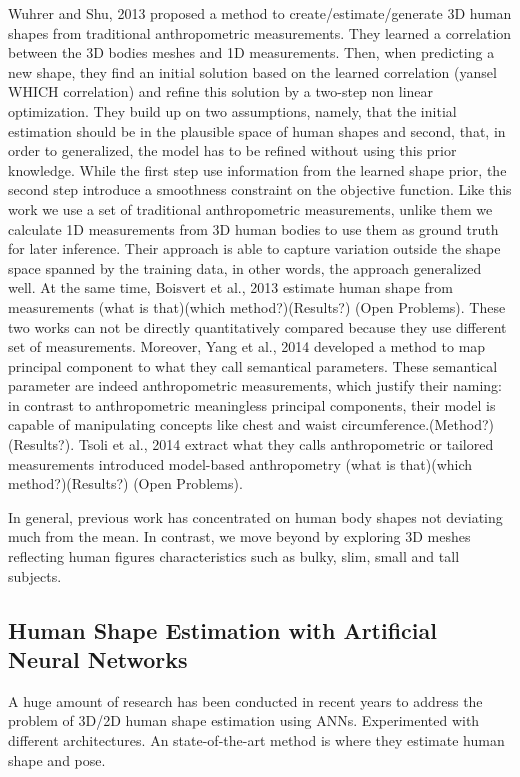 \documentclass[runningheads, orivec]{llncs}
\begin{document}
Wuhrer and Shu, 2013 \cite{Wuhrer.2013} proposed a method to 
create/estimate/generate 3D human shapes from traditional anthropometric 
measurements. They learned a correlation between the 3D bodies meshes and 1D 
measurements. Then, when predicting a new shape, they find an initial solution 
based on the learned correlation (yansel WHICH correlation) and refine this 
solution by a two-step non linear optimization. They build up on two 
assumptions, namely, that the initial estimation should be in the plausible 
space of human shapes and second, that, in order to generalized, the model has 
to be refined without using this prior knowledge. While the first step use 
information from the learned shape prior, the second step introduce a 
smoothness constraint on the objective function. Like this work we use a set of 
traditional anthropometric measurements, unlike them we calculate 1D 
measurements from 3D human bodies to use them as ground truth for later 
inference. Their approach is able to capture variation outside the shape space 
spanned by the training data, in other words, the approach generalized well.
At the same time, Boisvert et al., 2013 \cite{Boisvert.2013} estimate human 
shape from measurements (what is that)(which method?)(Results?) (Open 
Problems). These two works can not be directly quantitatively compared because 
they use different set of measurements.
Moreover, Yang et al., 2014 \cite{Yang.2014} developed a method to map 
principal component to what they call semantical parameters. These semantical 
parameter are indeed anthropometric measurements, which justify their naming: 
in contrast to anthropometric meaningless principal components, their model is 
capable of manipulating concepts like chest and waist 
circumference.(Method?)(Results?).   
Tsoli et al., 2014 \cite{Tsoli.2014} extract what they calls anthropometric or 
tailored measurements introduced model-based anthropometry (what is that)(which 
method?)(Results?) (Open Problems).

In general, previous work has concentrated on human body shapes not deviating 
much from the mean. In contrast, we move beyond by exploring 3D meshes 
reflecting human figures characteristics such as bulky, slim, small and 
tall subjects.

\subsection{Human Shape Estimation with Artificial Neural Networks}
A huge amount of research has been conducted in recent years to address the 
problem of 3D/2D human shape estimation using ANNs. Experimented with different 
architectures.
An state-of-the-art method is \cite{kanazawaHMR18} where they estimate human 
shape and pose.
\end{document}
